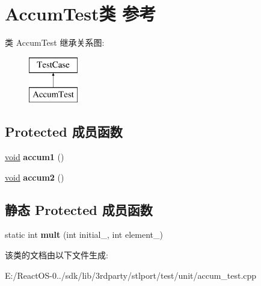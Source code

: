 \hypertarget{class_accum_test}{}\section{Accum\+Test类 参考}
\label{class_accum_test}
类 Accum\+Test 继承关系图\+:\begin{figure}[H]
\begin{center}
\leavevmode
\includegraphics[height=2.000000cm]{class_accum_test}
\end{center}
\end{figure}
\subsection*{Protected 成员函数}
\begin{DoxyCompactItemize}
\item 
\mbox{\label{class_accum_test_aeab4bc1f014a7628424a9ae480152fec}} 
\hyperlink{interfacevoid}{void} {\bfseries accum1} ()
\item 
\mbox{\label{class_accum_test_a25769fb0c2ac6801e188afac19af4daf}} 
\hyperlink{interfacevoid}{void} {\bfseries accum2} ()
\end{DoxyCompactItemize}
\subsection*{静态 Protected 成员函数}
\begin{DoxyCompactItemize}
\item 
\mbox{\label{class_accum_test_a23a71e85b37deb1340ffb2ac47b0e9b3}} 
static int {\bfseries mult} (int initial\+\_\+, int element\+\_\+)
\end{DoxyCompactItemize}


该类的文档由以下文件生成\+:\begin{DoxyCompactItemize}
\item 
E\+:/\+React\+O\+S-\/0../sdk/lib/3rdparty/stlport/test/unit/accum\+\_\+test.\+cpp\end{DoxyCompactItemize}

